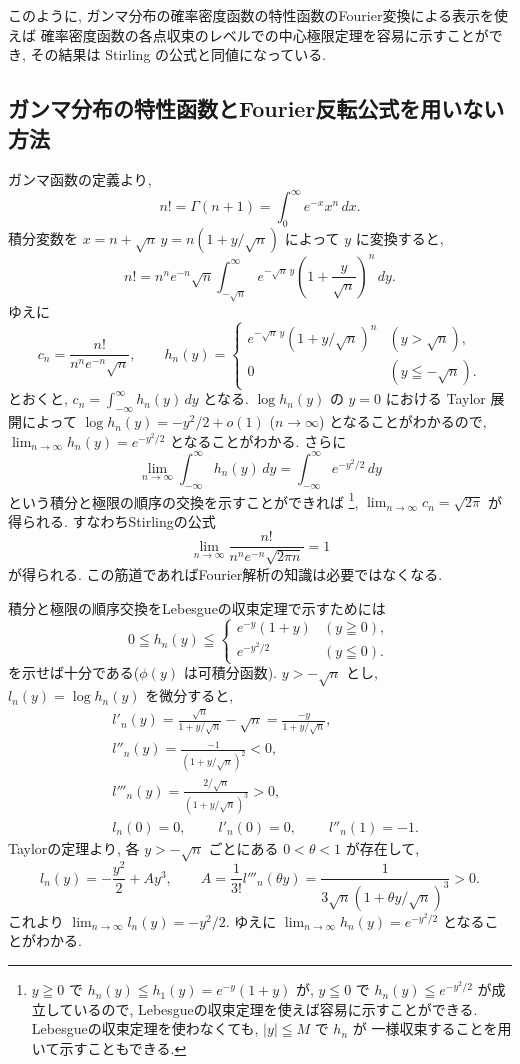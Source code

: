 \documentclass[12pt,twoside]{jarticle}
\theoremstyle{jplain}
\theoremstyle{jplain}
\theoremstyle{jplain}
\numberwithin{theorem}{section}
\numberwithin{equation}{section}
\numberwithin{figure}{section}
\numberwithin{table}{section}
\begin{document}
このように,
ガンマ分布の確率密度函数の特性函数のFourier変換による表示を使えば
確率密度函数の各点収束のレベルでの中心極限定理を容易に示すことができ,
その結果は Stirling の公式と同値になっている.


\subsection{ガンマ分布の特性函数とFourier反転公式を用いない方法}
\label{sec:pconv-2}

ガンマ函数の定義より,
\[
n! = \Gamma(n+1)=\int_0^\infty e^{-x} x^n\,dx.
\]
積分変数を $x=n+\sqrt{n}\,y=n(1+y/\sqrt{n})$ によって $y$ に変換すると,
\[
n! = n^n e^{-n}\sqrt{n} \int_{-\sqrt{n}}^\infty e^{-\sqrt{n}\,y}\left(1+\frac{y}{\sqrt{n}}\right)^n\,dy.
\]
ゆえに
\[
c_n = \frac{n!}{n^n e^{-n}\sqrt{n}},
\qquad
h_n(y) =
\begin{cases}
e^{-\sqrt{n}\,y}(1+y/\sqrt{n})^n & (y>\sqrt{n}), \\
0 & (y\leqq -\sqrt{n}).
\end{cases}
\]
とおくと, $c_n=\int_{-\infty}^\infty h_n(y)\,dy$ となる.
$\log h_n(y)$ の $y=0$ における Taylor 展開によって
$\log h_n(y) = -y^2/2 + o(1)$ ($n\to\infty$)
となることがわかるので,  $\lim_{n\to\infty} h_n(y)=e^{-y^2/2}$ となることがわかる.
さらに
\[
  \lim_{n\to\infty}\int_{-\infty}^\infty h_n(y)\,dy
 =\int_{-\infty}^\infty e^{-y^2/2}\,dy
\]
という積分と極限の順序の交換を示すことができれば%
\footnote{$y\geqq 0$ で $h_n(y)\leqq h_1(y)=e^{-y}(1+y)$ が,
$y\leqq 0$ で $h_n(y)\leqq e^{-y^2/2}$ が成立しているので,
Lebesgueの収束定理を使えば容易に示すことができる.
Lebesgueの収束定理を使わなくても, $|y|\leqq M$ で $h_n$ が
一様収束することを用いて示すこともできる.},
$\lim_{n\to\infty}c_n=\sqrt{2\pi}$ が得られる. すなわちStirlingの公式
\[
\lim_{n\to\infty} \frac{n!}{n^n e^{-n} \sqrt{2\pi n}}=1
\]
が得られる.  この筋道であればFourier解析の知識は必要ではなくなる.

積分と極限の順序交換をLebesgueの収束定理で示すためには
\[
0\leqq h_n(y)\leqq
\begin{cases}
e^{-y}(1+y) & (y\geqq 0), \\
e^{-y^2/2}  & (y\leqq 0).
\end{cases}
\]
を示せば十分である($\phi(y)$ は可積分函数).
$y>-\sqrt{n}$ とし, $l_n(y)=\log h_n(y)$ を微分すると,
\begin{align*}
&
l'_n(y)
=\frac{\sqrt{n}}{1+y/\sqrt{n}}-\sqrt{n}
=\frac{-y}{1+y/\sqrt{n}},
\\ &
l''_n(y)=\frac{-1}{(1+y/\sqrt{n})^2}<0,
\\ &
l'''_n(y)=\frac{2/\sqrt{n}}{(1+y/\sqrt{n})^3}>0,
\\ &
l_n(0)=0, \qquad\;
l'_n(0)=0, \qquad\;
l''_n(1)=-1.
\end{align*}
Taylorの定理より, 各 $y>-\sqrt{n}$ ごとにある $0<\theta<1$ が存在して,
\[
l_n(y) = -\frac{y^2}{2} + Ay^3, \qquad
A = \frac{1}{3!}l'''_n(\theta y) =
\frac{1}{3\sqrt{n}(1+\theta y/\sqrt{n})^3} > 0.
\]
これより $\lim_{n\to\infty}l_n(y)=-y^2/2$.
ゆえに $\lim_{n\to\infty}h_n(y)=e^{-y^2/2}$ となることがわかる.
\end{document}
